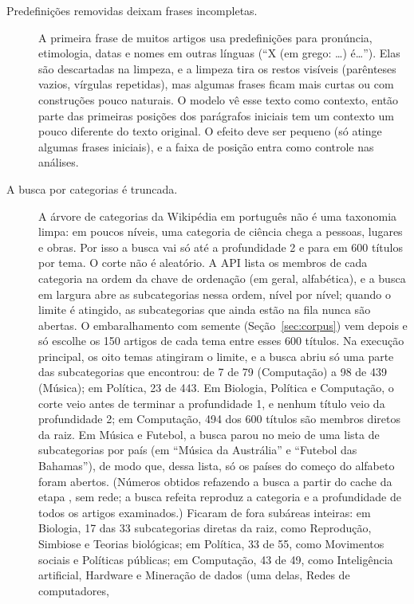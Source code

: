 \begin{description}
    \item[Predefinições removidas deixam frases incompletas.] A primeira frase de muitos
    artigos usa predefinições para pronúncia, etimologia, datas e nomes em outras línguas
    (``X (em grego: \ldots) é\ldots''). Elas são descartadas na limpeza, e a limpeza tira os
    restos visíveis (parênteses vazios, vírgulas repetidas), mas algumas frases ficam mais
    curtas ou com construções pouco naturais. O modelo vê esse texto como contexto, então parte
    das primeiras posições dos parágrafos iniciais tem um contexto um pouco diferente do texto
    original. O efeito deve ser pequeno (só atinge algumas frases iniciais), e a faixa de
    posição entra como controle nas análises.

    \item[A busca por categorias é truncada.] A árvore de categorias da Wikipédia em português
    não é uma taxonomia limpa: em poucos níveis, uma categoria de ciência chega a pessoas,
    lugares e obras. Por isso a busca vai só até a profundidade 2 e para em 600 títulos por
    tema. O corte não é aleatório. A API lista os membros de cada categoria na ordem da chave de
    ordenação (em geral, alfabética), e a busca em largura abre as subcategorias nessa ordem,
    nível por nível; quando o limite é atingido, as subcategorias que ainda estão na fila nunca
    são abertas. O embaralhamento com semente (Seção~\ref{sec:corpus}) vem depois e só escolhe
    os 150 artigos de cada tema entre esses 600 títulos. Na execução principal, os oito temas
    atingiram o limite, e a busca abriu só uma parte das subcategorias que encontrou: de 7 de
    79 (Computação) a 98 de 439 (Música); em Política, 23 de 443. Em Biologia, Política e
    Computação, o corte veio antes de terminar a profundidade 1, e nenhum título veio da
    profundidade 2; em Computação, 494 dos 600 títulos são membros diretos da raiz. Em Música e
    Futebol, a busca parou no meio de uma lista de subcategorias por país (em ``Música da
    Austrália'' e ``Futebol das Bahamas''), de modo que, dessa lista, só os países do começo do
    alfabeto foram abertos. (Números obtidos refazendo a busca a partir do cache da etapa
    , sem rede; a busca refeita reproduz a categoria e a profundidade de todos os
    artigos examinados.) Ficaram de fora subáreas inteiras: em Biologia, 17 das 33
    subcategorias diretas da raiz, como Reprodução, Simbiose e Teorias biológicas; em Política,
    33 de 55, como Movimentos sociais e Políticas públicas; em Computação, 43 de 49, como
    Inteligência artificial, Hardware e Mineração de dados (uma delas, Redes de computadores,

\end{description}
